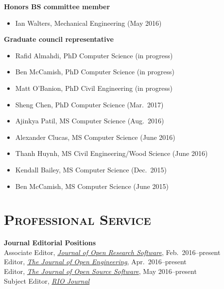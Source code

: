 \documentclass[margin,line,11pt]{res}
\begin{document}
\begin{resume}
\textbf{Honors BS committee member}
\begin{itemize}[leftmargin=*]
    \item Ian Walters, Mechanical Engineering (May 2016)
\end{itemize}

\textbf{Graduate council representative}
\begin{itemize}[leftmargin=*]
    \item Rafid Almahdi, PhD Computer Science (in progress)
    \item Ben McCamish, PhD Computer Science (in progress)
    \item Matt O'Banion, PhD Civil Engineering (in progress)
    \item Sheng Chen, PhD Computer Science (Mar.~2017)
    \item Ajinkya Patil, MS Computer Science (Aug.~2016)
    \item Alexander Clucas, MS Computer Science (June 2016)
    \item Thanh Huynh, MS Civil Engineering\slash Wood Science (June 2016)
    \item Kendall Bailey, MS Computer Science (Dec.~2015)
    \item Ben McCamish, MS Computer Science (June 2015)
\end{itemize}

\section{\textsc{Professional Service}}

\textbf{Journal Editorial Positions} \\
Associate Editor, \href{http://openresearchsoftware.metajnl.com}{\emph{Journal of Open Research Software}}, Feb.\ 2016--present \\
Editor, \href{http://www.tjoe.org}{\emph{The Journal of Open Engineering}}, Apr.\ 2016--present \\
Editor, \href{http://joss.theoj.org}{\emph{The Journal of Open Source Software}}, May 2016--present \\
Subject Editor, \href{http://riojournal.com}{\emph{RIO Journal}}


\end{resume}
\end{document}
